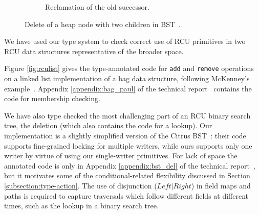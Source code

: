 \begin{figure}[!t]
\begin{subfigure}[b]{.4\linewidth}
\caption{Reclamation of the old successor.}
\label{fig:del2.6}
\end{subfigure}
\caption{\textsf{Delete} of a heap node with two children in BST~\cite{Arbel:2014:CUR:2611462.2611471}.}
\label{fig:del2}
\end{figure}
We have used our type system to check correct use of RCU primitives in two RCU data structures representative of the broader space.

Figure \ref{fig:rculist} gives the type-annotated code for \lstinline|add| and \lstinline|remove| operations on a linked list implementation of a bag data structure, following McKenney's example~\cite{McKenney2015SomeEO}.
Appendix \ref{appendix:bag_paul} of the technical report~\cite{isotek} contains the code for membership checking.

We have also type checked the most challenging part of an RCU binary search tree, the deletion (which also contains the code for a lookup).
Our implementation is a slightly simplified version of the Citrus BST~\cite{Arbel:2014:CUR:2611462.2611471}: their code supports fine-grained locking for multiple writers, while ours supports only one writer by virtue of using our single-writer primitives. For lack of space the annotated code is only in Appendix \ref{appendix:bst_del} of the technical report~\cite{isotek}, but it motivates some of the conditional-related flexibility discussed in Section \ref{subsection:type-action}.
The use of disjunction ($Left|Right$) in field maps and paths is required to capture traversals which follow different fields at different times, such as the lookup in a binary search tree.

